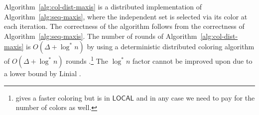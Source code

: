 \documentclass[11pt]{article}
\newcommand{\Wmax}{W}%
\newcommand{\InIS}{\texttt{InIS}}
\newcommand{\NotInIS}{\texttt{NotInIS}}
\begin{document}
\newcommand{\DistAlgColor}
{
\begin{algorithm}[htbp]
	\label{alg:col-dist-maxis}
	\caption{Coloring-based distributed $\Delta$-approximation for weighted MaxIS, code for node $v$}
	Run a $\Delta+1$ coloring algorithm\\
	Let $c:v \rightarrow [\Delta+1]$ be a coloring for the nodes\\
	$w(v) = w_v $\\
	\ForEach{$reduce(w')$ received from $u\in N(v)$}
	{
		$w(v) = w(v) - w'$\\
		$N(v) = N(v) \setminus \{ u \}$\\
		\If{$w(v) \leq 0$}
		{
			Send $removed(v)$ to all neighbors\\
			return \NotInIS \\					
		}			
	}
	\ForEach{$removed(u)$ received from $N(v)$}
	{
		$N(v) = N(v) \setminus \{ u \}$\\
	}		
	\If{$N(v)=\emptyset$}
	{
		Send $addedToIS(v)$ to all neighbors\\
		Return \InIS \\			
	}
	\If{$addedToIS(u)$ received from $N(v)$}
	{
		Send $removed(v)$ to all neighbors\\
		Return \NotInIS \\		
	}
	\If{$\forall u\in N(v)\setminus \{v\}$ it holds that $c(v) > c(u)$}
	{
		\ForEach{$u \in N(v)$}
		{
			Send $reduce(w(v))$
		}
		$w(v) = 0$\\
	}
\end{algorithm}
}
Algorithm~\ref{alg:col-dist-maxis} is a distributed implementation of Algorithm~\ref{alg:seq-maxis}, where the independent set is selected via its color at each iteration. The correctness of the algorithm follows from the correctness of Algorithm~\ref{alg:seq-maxis}. The number of rounds of Algorithm~\ref{alg:col-dist-maxis} is $O(\Delta + \log^* n)$ by using a deterministic distributed coloring algorithm of $O(\Delta + \log^* n)$ rounds \cite{barenboim2009distributed,Barenboim15}.\footnote{\cite{fraigniaud2015local} gives a faster coloring but is in $\mathsf{LOCAL}$ and in any case we need to pay for the number of colors as well.} The $\log^* n$ factor cannot be improved upon due to a lower bound by Linial \cite{Linial1987}. 
\end{document}
